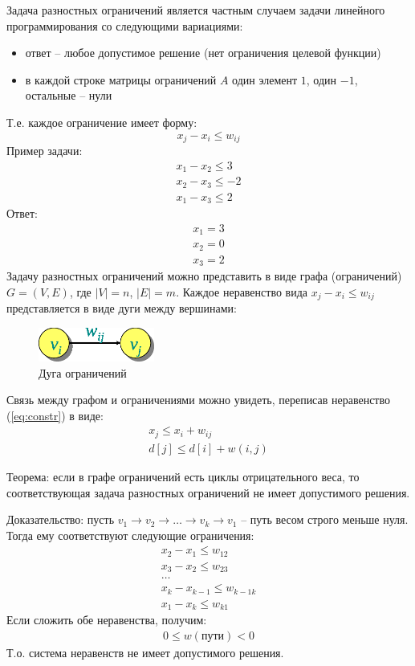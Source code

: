\documentclass[11pt]{article}
\begin{document}
Задача разностных ограничений является частным случаем задачи линейного программирования со следующими вариациями:
\begin{itemize}
\item ответ -- любое допустимое решение (нет ограничения целевой функции)
\item в каждой строке матрицы ограничений $A$ один элемент $1$, один $-1$, остальные -- нули
\end{itemize}
Т.е. каждое ограничение имеет форму:
\begin{equation}
  x_j - x_i \leqslant w_{i j}
  \label{eq:constr}
\end{equation}
Пример задачи:
\begin{align*}
  x_1 - x_2 \leqslant 3 \\
  x_2 - x_3 \leqslant -2 \\
  x_1 - x_3 \leqslant 2  
\end{align*}
Ответ:
\begin{align*}
  x_1 = 3 \\
  x_2 = 0 \\
  x_3 = 2 
\end{align*}
Задачу разностных ограничений можно представить в виде графа (ограничений) $G=(V, E)$, где $|V|=n$, $|E|=m$. Каждое неравенство вида $x_j - x_i \leqslant w_{i j}$ представляется в виде дуги между вершинами:
\begin{figure}[h!]
  \centering
  \includegraphics[width=1.5in]{lecture18/edge.eps}
  \caption{Дуга ограничений}
\end{figure}
Связь между графом и ограничениями можно увидеть, переписав неравенство (\ref{eq:constr}) в виде:
\begin{align*}
  x_j \leqslant x_i + w_{i j} \\
  d[j] \leqslant d[i] + w(i, j)
\end{align*}

Теорема: если в графе ограничений есть циклы отрицательного веса, то соответствующая задача разностных ограничений не имеет допустимого решения.

Доказательство: пусть $v_1 \rightarrow v_2 \rightarrow \ldots \rightarrow v_k \rightarrow v_1$ -- путь весом строго меньше нуля. Тогда ему соответствуют следующие ограничения:
\begin{align*}
  x_2 - x_1 \leqslant w_{12} \\
  x_3 - x_2 \leqslant w_{23} \\
  \ldots \\
  x_k - x_{k-1} \leqslant w_{k-1 k} \\
  x_1 - x_k \leqslant w_{k 1}
\end{align*}
Если сложить обе неравенства, получим:
\begin{align*}
  0 \leqslant w(\text{пути}) < 0
\end{align*}
Т.о. система неравенств не имеет допустимого решения.
\end{document}
